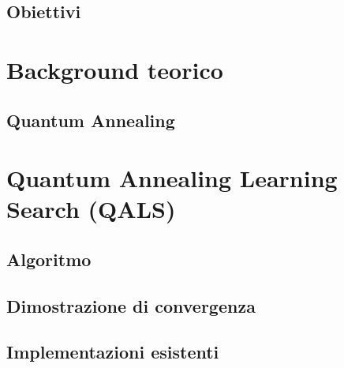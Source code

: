 \documentclass[12pt,a4paper,oneside]{report}
\begin{document}
\section{Obiettivi}
\label{sec:obiettivi}

\chapter{Background teorico}
\label{ch:background}

\section{Quantum Annealing}
\label{sec:quantum-annealing}

\chapter{Quantum Annealing Learning Search (QALS)}
\label{ch:qals}

\section{Algoritmo}
\label{sec:qals-algoritmo}

\section{Dimostrazione di convergenza}
\label{sec:qals-convergenza}

\section{Implementazioni esistenti}
\label{sec:qals-implementazioni}
\end{document}
